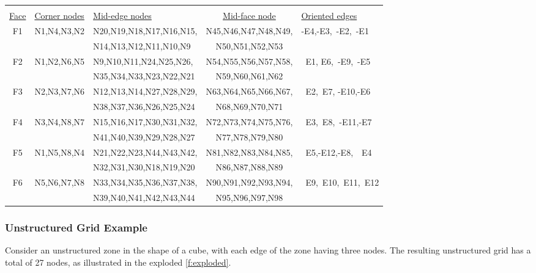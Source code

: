 {{{\begin{tabular}{@{}>{\ttfamily}c >{\ttfamily}l >{\ttfamily\color{red}}l >{\ttfamily\color{blue}}c >{\ttfamily}l}
   \multicolumn{5}{@{}l}{\uline{\textit{Face Definition}}} \\[6pt]
   \uline{\textnormal{Face}} & \uline{\textnormal{Corner nodes}} & \uline{\textnormal{Mid-edge nodes}} & \uline{\textnormal{Mid-face node}} & \uline{\textnormal{Oriented edges}} \\[3pt]
   F1 & N1,N4,N3,N2 & N20,N19,N18,N17,N16,N15,         & N45,N46,N47,N48,N49,  & -E4,-E3,\ -E2,\ -E1   \\
   ~  &     ~       & N14,N13,N12,N11,N10,N9           & N50,N51,N52,N53       & ~ \\
   F2 & N1,N2,N6,N5 & N9,N10,N11,N24,N25,N26,          & N54,N55,N56,N57,N58,  & \ E1, E6,\ -E9,\ -E5  \\
   ~  &     ~       & N35,N34,N33,N23,N22,N21          & N59,N60,N61,N62       & ~ \\
   F3 & N2,N3,N7,N6 & N12,N13,N14,N27,N28,N29,         & N63,N64,N65,N66,N67,  & \ E2,\ E7, -E10,-E6   \\
   ~  &     ~       & N38,N37,N36,N26,N25,N24          & N68,N69,N70,N71       & ~ \\
   F4 & N3,N4,N8,N7 & N15,N16,N17,N30,N31,N32,         & N72,N73,N74,N75,N76,  & \ E3,\ E8,\ -E11,-E7  \\
   ~  &     ~       & N41,N40,N39,N29,N28,N27          & N77,N78,N79,N80       & ~ \\
   F5 & N1,N5,N8,N4 & N21,N22,N23,N44,N43,N42,         & N81,N82,N83,N84,N85,  & \ E5,-E12,-E8,\ \ E4  \\
   ~  &     ~       & N32,N31,N30,N18,N19,N20          & N86,N87,N88,N89       & ~ \\
   F6 & N5,N6,N7,N8 & N33,N34,N35,N36,N37,N38,         & N90,N91,N92,N93,N94,  & \ E9,\ E10,\ E11,\ E12 \\
   ~  &     ~       & N39,N40,N41,N42,N43,N44          & N95,N96,N97,N98    
\end{tabular}

\subsubsection{Unstructured Grid Example}
\label{s:unst_example}

Consider an unstructured zone in the shape of a cube, with each edge
of the zone having three nodes.
The resulting unstructured grid has a total of 27 nodes, as illustrated
in the exploded \autoref{f:exploded}.

}}}
